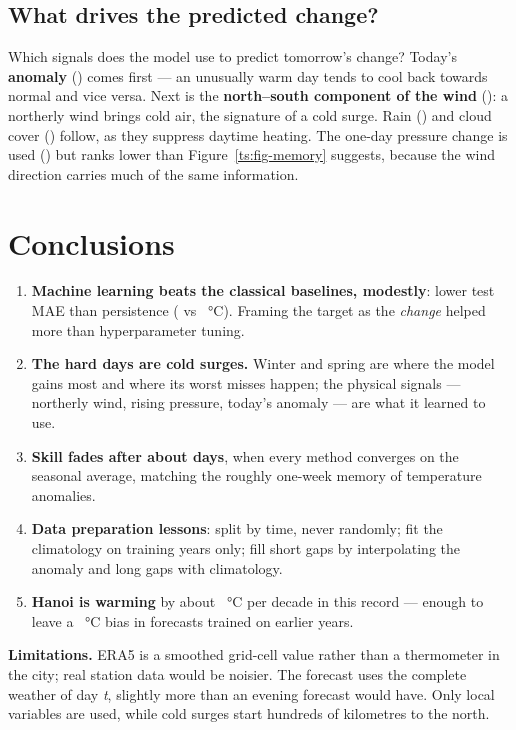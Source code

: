 \subsection{What drives the predicted change?}
\begin{finding}
\Q Which signals does the model use to predict tomorrow's change?
\F Today's \textbf{anomaly} (\TSImpAnom) comes first — an unusually warm day tends to cool back towards normal and vice versa.
Next is the \textbf{north–south component of the wind} (\TSImpWind): a northerly wind brings cold air, the signature of a cold
surge. Rain (\TSImpRain) and cloud cover (\TSImpCloud) follow, as they suppress daytime heating. The one-day pressure change is
used (\TSImpDp) but ranks lower than Figure~\ref{ts:fig-memory} suggests, because the wind direction carries much of the same
information.
\end{finding}

\section{Conclusions}\label{ts:conclusion}
\begin{enumerate}
\item \textbf{Machine learning beats the classical baselines, modestly}: \TSTestSkill{} lower test MAE than persistence
(\TSTestFinal{} vs \TSTestPersist~°C). Framing the target as the \emph{change} helped more than hyperparameter tuning.
\item \textbf{The hard days are cold surges.} Winter and spring are where the model gains most and where its worst misses happen;
the physical signals — northerly wind, rising pressure, today's anomaly — are what it learned to use.
\item \textbf{Skill fades after about \TSUseful{} days}, when every method converges on the seasonal average, matching the
roughly one-week memory of temperature anomalies.
\item \textbf{Data preparation lessons}: split by time, never randomly; fit the climatology on training years only; fill short
gaps by interpolating the anomaly and long gaps with climatology.
\item \textbf{Hanoi is warming} by about \TSTrend~°C per decade in this record — enough to leave a \TSResMean~°C bias in
forecasts trained on earlier years.
\end{enumerate}
\textbf{Limitations.} ERA5 is a smoothed grid-cell value rather than a thermometer in the city; real station data would be
noisier. The forecast uses the complete weather of day \emph{t}, slightly more than an evening forecast would have. Only local
variables are used, while cold surges start hundreds of kilometres to the north.

